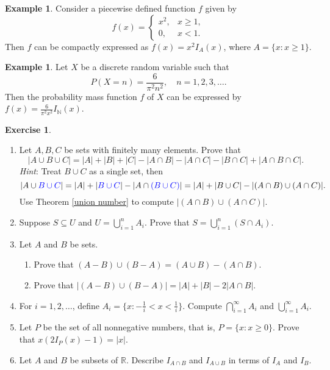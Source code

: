 \documentclass[12pt,letterpaper]{book}
\def\blue{\textcolor{blue}}
\numberwithin{equation}{section}
\theoremstyle{definition}
\newtheorem{example}[thm]{\textbf{Example}}
\newtheorem{exercise}{\textbf{Exercise}}[chapter]
\begin{document}
\begin{example}
Consider a piecewise defined function $f$ given by $$f(x)=\begin{cases} x^2,&x\geq 1,\\ 0,&x<1. \end{cases}$$ Then $f$ can be compactly expressed as $f(x)=x^2I_A(x)$, where $A=\{x:x\geq 1\}$.
\end{example}

\begin{example}
Let $X$ be a discrete random variable such that
$$P(X=n)=\frac{6}{\pi^2n^2},\quad n=1,2,3,\ldots.$$ Then the probability mass function $f$ of $X$ can be expressed by $f(x)=\frac{6}{\pi^2x^2}I_{\mathbb{N}}(x)$.
\end{example}


\begin{exercise}\quad
\begin{enumerate}[\bfseries 1.]

\item Let $A,B,C$ be sets with finitely many elements. Prove that
$$|A\cup B\cup C|=|A|+|B|+|C|-|A\cap B|-|A\cap C|-|B\cap C|+|A\cap B\cap C|.$$
\textit{Hint}: Treat $B\cup C$ as a single set, then
$$|A\cup \blue{B\cup C}|=|A|+|\blue{B\cup C}|-|A\cap \blue{(B\cup C)}|=|A|+|B\cup C|-|(A\cap B)\cup (A\cap C)|.$$
Use Theorem \ref{union number} to compute $|(A\cap B)\cup (A\cap C)|$.

\item Suppose $S\subseteq U$ and $U=\displaystyle{\bigcup_{i=1}^n A_i}$. Prove that $S=\displaystyle{\bigcup_{i=1}^n (S\cap A_i)}$.

\item Let $A$ and $B$ be sets.
\begin{enumerate}
\item Prove that $(A-B)\cup (B-A)=(A\cup B)-(A\cap B)$.
\item Prove that $|(A-B)\cup (B-A)|=|A|+|B|-2|A\cap B|$.
\end{enumerate}

\item For $i=1,2,\ldots$, define $A_i=\{x: -\frac{1}{i}<x<\frac{1}{i}\}$. Compute $\displaystyle{\bigcap_{i=1}^\infty A_i}$ and $\displaystyle{\bigcup_{i=1}^\infty A_i}$.

\item Let $P$ be the set of all nonnegative numbers, that is, $P=\{x:x\geq 0\}$. Prove that $x(2I_P(x)-1)=|x|$.

\item Let $A$ and $B$ be subsets of $\mathbb{R}$. Describe $I_{A\cap B}$ and $I_{A\cup B}$ in terms of $I_A$ and $I_B$.
\end{enumerate}
\end{exercise}
\end{document}
